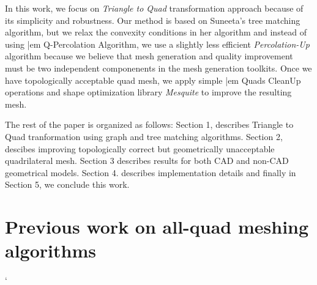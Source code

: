 \documentclass[11pt, a4paper]{paper}
\begin{document}
In this work, we focus on {\em Triangle to Quad} transformation approach because 
of its simplicity and robustness. Our method is based on Suneeta's tree
matching algorithm, but we relax the convexity conditions in her algorithm and
instead of using {|em Q-Percolation Algorithm}, we use a slightly less
efficient {\em Percolation-Up } algorithm because we believe that mesh
generation and quality improvement must be two independent componenents in the
mesh generation toolkits. Once we have topologically acceptable quad mesh,
we apply simple {|em Quads CleanUp } operations and shape optimization library
{\em Mesquite} to improve the resulting mesh.

The rest of the paper is organized as follows: Section 1, describes Triangle to Quad tranformation using graph and tree matching algorithms. Section 2, descibes improving topologically correct but geometrically unacceptable quadrilateral mesh. Section 3 describes results for both CAD and non-CAD geometrical models.
Section 4. describes implementation details and finally in Section 5, we conclude this work.

\section {Previous work on all-quad meshing algorithms}



`
\end{document}
